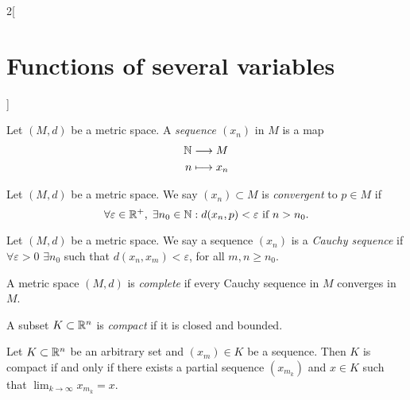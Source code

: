 \documentclass[../../../main.tex]{subfiles}
\begin{document}
\begin{multicols}{2}[\section{Functions of several variables}]
\begin{definition}
        Let $(M,d)$ be a metric space. A \textit{sequence $(x_n)$} in $M$ is a map
        \begin{align*}
            \mathbb{N} & \longrightarrow M \\
            n   & \longmapsto x_n
        \end{align*}
    \end{definition}
    \begin{definition}
        Let $(M,d)$ be a metric space. We say $(x_n)\subset M$ is \textit{convergent} to $p\in M$ if $$\forall\varepsilon\in\mathbb{R}^+,\;\exists n_0\in\mathbb{N} :d(x_n,p)<\varepsilon\text{ if }n>n_0.$$
    \end{definition}
    \begin{definition}
        Let $(M,d)$ be a metric space. We say a sequence $(x_n)$ is a \textit{Cauchy sequence} if $\forall\varepsilon>0$ $\exists n_0$ such that $d(x_n,x_m)<\varepsilon$, for all $m,n\geq n_0$.
    \end{definition}
    \begin{definition}
        A metric space $(M,d)$ is \textit{complete} if every Cauchy sequence in $M$ converges in $M$.
        \label{FOSV_complete}
    \end{definition}
    \begin{definition}
        A subset $K\subset\mathbb{R}^n$ is \textit{compact} if it is closed and bounded.
    \end{definition}
    \begin{theorem}
        Let $K\subset\mathbb{R}^n$ be an arbitrary set and $(x_m)\in K$ be a sequence. Then $K$ is compact if and only if there exists a partial sequence $(x_{m_k})$ and $x\in K$ such that $\displaystyle\lim_{k\to\infty}x_{m_k}=x$.
    \end{theorem}

\end{multicols}
\end{document}
